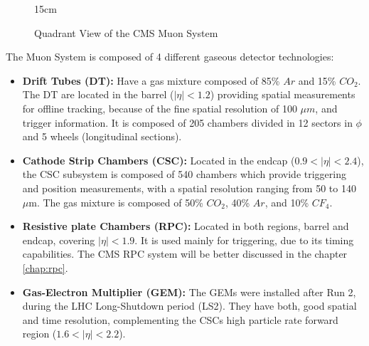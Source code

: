 \begin{figure}[!htm]{15cm}
\caption{Quadrant View of the CMS Muon System}%
\label{fig:cms_muon}
\end{figure}

The Muon System is composed of 4 different gaseous detector technologies:
\begin{itemize}
    \item \textbf{Drift Tubes (DT):} Have a gas mixture composed of 85\% $Ar$ and 15\% $CO_2$. The DT are located in the barrel ($|\eta| < 1.2$) providing spatial measurements for offline tracking, because of the fine spatial resolution of 100 $\mu m$, and trigger information. It is composed of 205 chambers divided in 12 sectors in $\phi$ and 5 wheels (longitudinal sections). 
    \item \textbf{Cathode Strip Chambers (CSC):} Located in the endcap ($0.9 < |\eta| < 2.4$), the CSC subsystem is composed of 540 chambers which provide triggering and position measurements, with a spatial resolution ranging from 50 to 140 $\mu$m. The gas mixture is composed of 50\% $CO_2$, 40\% $Ar$, and 10\% $CF_4$. 
    \item \textbf{Resistive plate Chambers (RPC):} Located in both regions, barrel and endcap, covering $|\eta| < 1.9$. It is used mainly for triggering, due to its timing capabilities. The CMS RPC system will be better discussed in the chapter \ref{chap:rpc}.
    \item \textbf{Gas-Electron Multiplier (GEM):} The GEMs were installed after Run 2, during the LHC Long-Shutdown period (LS2). They have both, good spatial and time resolution, complementing the CSCs high particle rate forward region ($ 1.6 < |\eta| < 2.2$).
\end{itemize}

